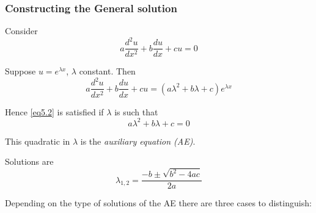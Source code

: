 
\subsubsection*{Constructing the General solution}

Consider
\begin{equation}
 a \dfrac{d^2u}{dx^2} + b \dfrac{du}{dx} + cu = 0
 \label{eq5.2}
\end{equation}

Suppose $u=e^{\lambda x}$, $\lambda$ constant. Then
\[
 a \dfrac{d^2u}{dx^2} + b \dfrac{du}{dx} + cu = (a\lambda^2 + b\lambda +c) e^{\lambda x}
\]

Hence \eqref{eq5.2} is satisfied if $\lambda$ is such that
\[
 a\lambda^2 + b\lambda +c = 0
\]

This quadratic in $\lambda$ is the \emph{auxiliary equation (AE)}.

Solutions are
\[
 \lambda_{1,2} = \dfrac{-b \pm \sqrt{b^2-4ac}}{2a}
\]

Depending on the type of solutions of the AE
there are three cases to distinguish:

